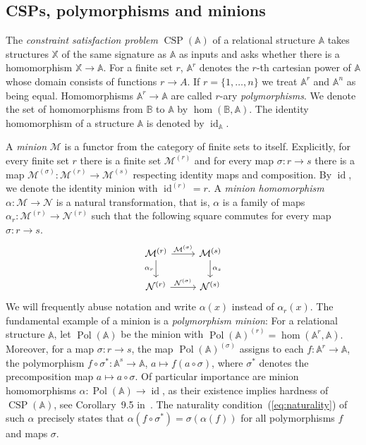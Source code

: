 \documentclass[oneside]{amsart}
\newcommand{\str}[1]{\mathbb{#1}}
\newcommand{\cat}[1]{\mathcal{#1}}
\newcommand{\pol}{\operatorname{Pol}}
\newcommand{\CSP}{\operatorname{CSP}}
\DeclareMathOperator{\id}{id}
\begin{document}
\subsection{CSPs, polymorphisms and minions}
\label{sec:PrelimsCSPs}
The \emph{constraint satisfaction problem} $\CSP(\str A)$ of a relational structure $\str A$ takes structures $\str X$ of the same signature as $\str A$ as inputs and asks whether there is a homomorphism $\str X\to\str A$.
For a finite set $r$, $\str {\str A}^r$ denotes the $r$-th cartesian power of $\str A$ whose domain consists of functions $r\to A$. 
If $r = \{1,\dots,n\}$ we treat ${\str A}^r$ and $\str A^n$ as being equal.
Homomorphisms $\str A^r\to\str A$ are called $r$-ary \emph{polymorphisms}.
We denote the set of homomorphisms from $\str B$ to $\str A$ by $\hom(\str B, \str A)$.
The identity homomorphism of a structure $\str A$ is denoted by $\id_{\str A}$.

A \emph{minion} $\cat M$ is a functor from the category of finite sets to itself.
Explicitly, for every finite set $r$ there is a finite set $\cat M^{(r)}$ and for every map $\sigma\colon r\to s$ there is a map 
$
\cat M^{(\sigma)}\colon \cat M^{(r)}\to \cat M^{(s)}
$
respecting identity maps and composition. 
By $\id$, we denote the identity minion with $\id^{(r)} = r$.
A \emph{minion homomorphism} $\alpha \colon \cat M \to \cat N$ is a natural transformation, that is, $\alpha$ is a family of maps $\alpha_r\colon \cat M^{(r)} \to \cat N^{(r)}$ such that the following square commutes for every map $\sigma\colon r \to s$.
\begin{equation}
\label{eq:naturality}
    \begin{tikzcd}
    \cat M^{(r)} \arrow[r, "\cat M^{(\sigma)}"] \arrow[d, "\alpha_r"'] & \cat M^{(s)} \arrow[d, "\alpha_s"]\\
    \cat N^{(r)} \arrow[r, "\cat N^{(\sigma)}"] & \cat N^{(s)}
\end{tikzcd}
\end{equation}
We will frequently abuse notation and write $\alpha(x)$ instead of $\alpha_r(x)$.
The fundamental example of a minion is a \emph{polymorphism minion}: For a relational structure $\str A$, let $\pol(\str A)$ be the minion with
$
    \pol(\str A)^{(r)} = \hom(\str A^r,\str A).
$
Moreover, for a map $\sigma\colon r\to s$, the map $\pol(\str A)^{(\sigma)}$ assigns to each $f\colon \str A^r\to \str A$, the polymorphism 
$f\circ\sigma^*\colon\str A^s\to \str A$, $a \mapsto f(a \circ \sigma)$, where $\sigma^*$ denotes the precomposition map $a\mapsto a\circ\sigma$.
Of particular importance are minion homomorphisms $\alpha\colon\pol(\str A)\to\id$, as their existence implies hardness of $\CSP(\str A)$, see Corollary~9.5 in~\cite{pcspBible}. The naturality condition~(\ref{eq:naturality}) of such $\alpha$ precisely states that
$
\alpha( f\circ \sigma^* ) = \sigma(\alpha(f))  
$
for all polymorphisms $f$ and maps $\sigma$.
\end{document}
